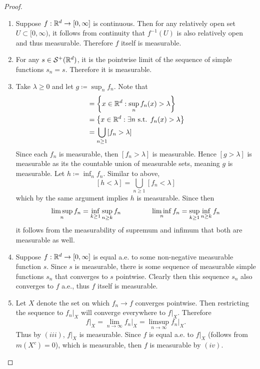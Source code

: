 \documentclass[hw_all.tex]{subfiles}
\begin{document}
\begin{proof}
    \begin{enumerate}
        \item
            Suppose $f : \mathbb{R}^d \to [0,\infty]$ is continuous. Then for any relatively open set $U \subset [0,\infty)$, it follows from continuity that $f^{-1}(U)$ is also relatively open and thus measurable. Therefore $f$ itself is measurable.

        \item 
            For any $s \in \mathcal{S}^+(\mathbb{R}^d)$, it is the pointwise limit of the sequence of simple functions $s_n = s$. Therefore it is measurable.

        \item 
            Take $\lambda \geq 0$ and let $g \coloneq \sup_{n} f_n$. Note that
            \begin{align*}
                [g > \lambda] &= \qty{x \in \R^d : \sup_n f_n(x) > \lambda } \\
                &= \qty{x \in \R^d : \exists n \text{ s.t. } f_n(x) > \lambda} \\
                &= \bigcup_{n \geq 1} [f_n > \lambda]
            \end{align*}
            Since each $f_n$ is measurable, then $[f_n > \lambda]$ is measurable. Hence $[g > \lambda]$ is measurable as its the countable union of measurable sets, meaning $g$ is measurable. Let $h \coloneq \inf_n f_n$. Similar to above,
            \[
                [h < \lambda] = \bigcup_{n \geq 1} [f_n < \lambda]
            \]
            which by the same argument implies $h$ is measurable. Since then
            \[
                \limsup_n f_n = \inf_{k \geq 1} \sup_{n \geq k} f_n \hspace{1.5cm} \liminf_n f_n = \sup_{k \geq 1} \inf_{n \geq k} f_n
            \]
            it follows from the measurability of supremum and infimum that both are measurable as well.

        \item 
            Suppose $f : \mathbb{R}^d \to [0,\infty]$ is equal a.e. to some non-negative measurable function $s$. Since $s$ is measurable, there is some sequence of measurable simple functions $s_n$ that converges to $s$ pointwise. Clearly then this sequence $s_n$ also converges to $f$ a.e., thus $f$ itself is measurable.

        \item 
            Let $X$ denote the set on which $f_n \to f$ converges pointwise. Then restricting the sequence to $f_n\vert_X$ will converge everywhere to $f\vert_X$. Therefore
            \[
                f\vert_X = \lim_{n \to \infty} f_n\vert_X = \limsup_{n \to \infty} f_n\vert_X
            .\]
            Thus by $(iii)$, $f\vert_X$ is measurable. Since $f$ is equal a.e. to $f\vert_X$ (follows from $m(X^c) = 0$), which is measurable, then $f$ is measurable by $(iv)$.


\end{enumerate}
\end{proof}
\end{document}
